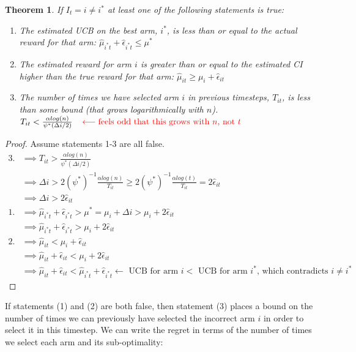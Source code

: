 \documentclass{article}
\newcommand{\eq}[1]{\begin{align*}#1\end{align*}}
\theoremstyle{plain}
\newtheorem{theorem}{Theorem}
\theoremstyle{definition}
\begin{document}
\begin{theorem} If $I_t = i \neq i^*$ at least one of the following statements is true:
\begin{enumerate}
\item The estimated UCB on the best arm, $i^*$, is less than or equal to the actual reward for that arm: $\hat{\mu}_{i^*t} + \hat{\epsilon}_{i^*t} \leq \mu^*$
\item The estimated reward for arm $i$ is greater than or equal to the estimated CI higher than the true reward for that arm: $\hat \mu_{it} \geq \mu_i + \hat \epsilon_{it}$
\item The number of times we have selected arm $i$ in previous timesteps, $T_{it}$, is less than some bound (that grows logarithmically with $n$). $T_{it} < \frac{\alpha log(n)}{\psi^*(\Delta i/2)} \;\;\; \color{red} \longleftarrow \text{feels odd that this grows with $n$, not $t$}$
\end{enumerate}
\end{theorem}
\begin{proof}
Assume statements 1-3 are all false.
\eq {
3. & \implies T_{it} > \frac{\alpha log(n)}{\psi^*(\Delta i/2)} \\
  & \implies \Delta i > 2 (\psi^*)^{-1} \frac{\alpha log(n)}{T_{it}} \geq 2 (\psi^*)^{-1} \frac{\alpha log(t)}{T_{it}} = 2 \hat \epsilon_{it}\\
  & \implies \Delta i > 2 \hat \epsilon_{it} \\[10pt]
1. & \implies \hat{\mu}_{i^*t} + \hat{\epsilon}_{i^*t}  >  \mu^*  = \mu_i+\Delta i > \mu_i +  2 \hat \epsilon_{it}\\
& \implies \hat{\mu}_{i^*t} + \hat{\epsilon}_{i^*t}  > \mu_i +  2 \hat \epsilon_{it}\\[10pt]
2. & \implies \hat \mu_{it} < \mu_i + \hat \epsilon_{it} \\
   & \implies \hat \mu_{it} + \hat \epsilon_{it} < \mu_i +2 \hat \epsilon_{it} \\
   & \implies \hat \mu_{it} + \hat \epsilon_{it} <  \hat{\mu}_{i^*t} + \hat{\epsilon}_{i^*t} \longleftarrow \text { UCB for arm $i < $ UCB for arm $i^*$, which contradicts $i \neq i^*$}
}

\end{proof}

If statements (1) and (2) are both false, then statement (3) places a bound on the number of times we can previously have selected the incorrect arm $i$ in order to select it in this timestep. We can write the regret in terms of the number of times we select each arm and its sub-optimality:
\end{document}
